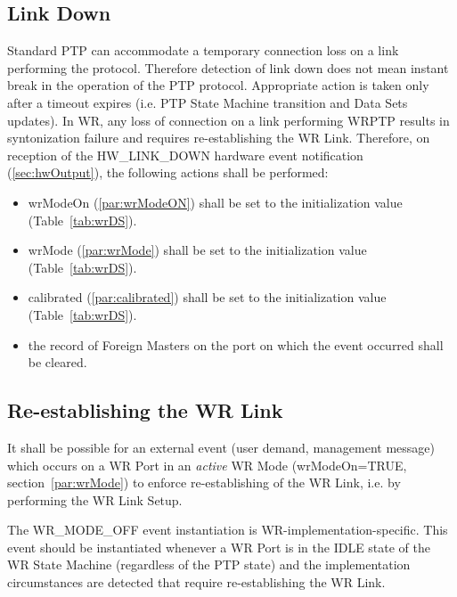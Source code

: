 \documentclass[a4paper, 12pt]{article}
\begin{document}
\addtocounter{footnote}{1}

\newpage

\subsection{Link Down}
\label{sec:LinkDown}

Standard PTP can accommodate a temporary connection loss on a link performing the protocol. Therefore 
detection of link down does not mean instant break in the operation of the PTP protocol. Appropriate 
action is taken only after a timeout expires (i.e. PTP State Machine transition and 
Data Sets updates). 
In WR, any loss of connection on a link performing WRPTP results in syntonization failure 
and requires re-establishing the WR Link. Therefore, on reception of the HW\_LINK\_DOWN hardware event 
notification (\ref{sec:hwOutput}), the following actions shall be performed:
\begin{itemize}
  \item wrModeOn (\ref{par:wrModeON}) shall be set to the initialization value (Table~\ref{tab:wrDS}).
  \item wrMode (\ref{par:wrMode}) shall be set to the initialization value (Table~\ref{tab:wrDS}).
  \item calibrated (\ref{par:calibrated}) shall be set to the initialization value (Table~\ref{tab:wrDS}).
  \item the record of Foreign Masters on the port on which the event occurred shall be cleared.
\end{itemize}


\subsection{Re-establishing the WR Link}
\label{sec:reestablishingWRLink}

It shall be possible for an external event (user demand, management message) which occurs on 
a WR Port in an \textit{active} WR Mode (wrModeOn=TRUE, section~\ref{par:wrMode}) 
to enforce re-establishing of the WR Link, i.e. by performing the WR Link Setup. 
 
The WR\_MODE\_OFF event instantiation is WR-implementation-specific. This event should be
instantiated whenever a WR Port is in the IDLE state of the WR State Machine (regardless of the
PTP state) and the implementation circumstances are detected that require re-establishing 
the WR Link.
\end{document}
